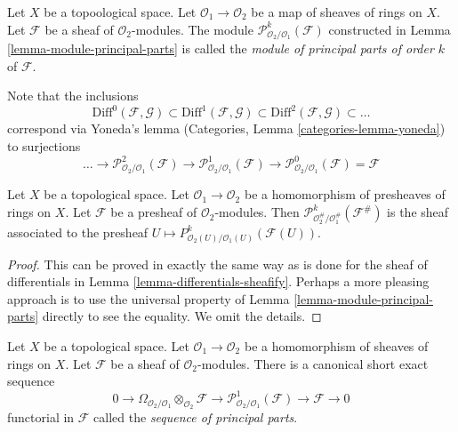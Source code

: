 \begin{definition}
\label{definition-module-principal-parts}
Let $X$ be a topoological space.
Let $\mathcal{O}_1 \to \mathcal{O}_2$ be a map of sheaves of rings on $X$.
Let $\mathcal{F}$ be a sheaf of $\mathcal{O}_2$-modules.
The module $\mathcal{P}^k_{\mathcal{O}_2/\mathcal{O}_1}(\mathcal{F})$
constructed in Lemma \ref{lemma-module-principal-parts}
is called the {\it module of principal parts of order $k$} of $\mathcal{F}$.
\end{definition}

\noindent
Note that the inclusions
$$
\text{Diff}^0(\mathcal{F}, \mathcal{G}) \subset
\text{Diff}^1(\mathcal{F}, \mathcal{G}) \subset
\text{Diff}^2(\mathcal{F}, \mathcal{G}) \subset \ldots
$$
correspond via Yoneda's lemma (Categories, Lemma \ref{categories-lemma-yoneda})
to surjections
$$
\ldots \to \mathcal{P}^2_{\mathcal{O}_2/\mathcal{O}_1}(\mathcal{F})
\to \mathcal{P}^1_{\mathcal{O}_2/\mathcal{O}_1}(\mathcal{F})
\to \mathcal{P}^0_{\mathcal{O}_2/\mathcal{O}_1}(\mathcal{F}) = \mathcal{F}
$$

\begin{lemma}
\label{lemma-differential-operators-sheafify}
Let $X$ be a topological space. Let $\mathcal{O}_1 \to \mathcal{O}_2$
be a homomorphism of presheaves of rings on $X$. Let $\mathcal{F}$ be a
presheaf of $\mathcal{O}_2$-modules. Then
$\mathcal{P}^k_{\mathcal{O}_2^\#/\mathcal{O}_1^\#}(\mathcal{F}^\#)$
is the sheaf associated to the presheaf
$U \mapsto P^k_{\mathcal{O}_2(U)/\mathcal{O}_1(U)}(\mathcal{F}(U))$.
\end{lemma}

\begin{proof}
This can be proved in exactly the same way as is done for the sheaf
of differentials in Lemma \ref{lemma-differentials-sheafify}.
Perhaps a more pleasing approach is to use the universal property
of Lemma \ref{lemma-module-principal-parts} directly to see the equality.
We omit the details.
\end{proof}

\begin{lemma}
\label{lemma-sequence-of-principal-parts}
Let $X$ be a topological space. Let $\mathcal{O}_1 \to \mathcal{O}_2$
be a homomorphism of sheaves of rings on $X$. Let $\mathcal{F}$ be a
sheaf of $\mathcal{O}_2$-modules. There is a
canonical short exact sequence
$$
0 \to
\Omega_{\mathcal{O}_2/\mathcal{O}_1} \otimes_{\mathcal{O}_2} \mathcal{F} \to
\mathcal{P}^1_{\mathcal{O}_2/\mathcal{O}_1}(\mathcal{F}) \to
\mathcal{F} \to 0
$$
functorial in $\mathcal{F}$ called the {\it sequence of principal parts}.
\end{lemma}

